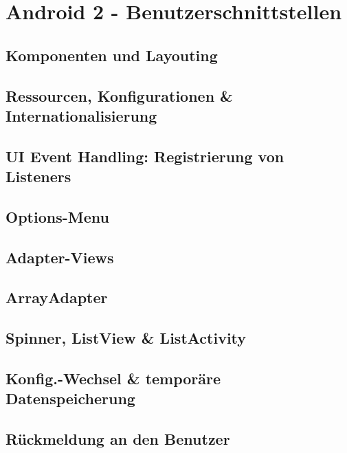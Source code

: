 \chapter{Android 2 - Benutzerschnittstellen}

\section{Komponenten und Layouting}

\section{Ressourcen, Konfigurationen \& Internationalisierung}

\section{UI Event Handling: Registrierung von Listeners}

\section{Options-Menu}

\section{Adapter-Views}

\section{ArrayAdapter}

\section{Spinner, ListView \& ListActivity}

\section{Konfig.-Wechsel \& temporäre Datenspeicherung}

\section{Rückmeldung an den Benutzer}